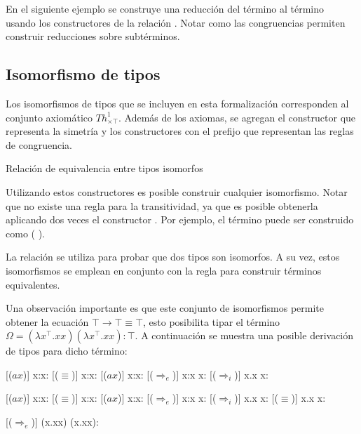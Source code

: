 \begin{example}
	En el siguiente ejemplo se construye una reducción del término  al término ~ usando los constructores de la relación \type{$\_\hookrightarrow\_$}.
	Notar como las congruencias permiten construir reducciones sobre subtérminos.
\end{example}

\subsection{Isomorfismo de tipos}

Los isomorfismos de tipos que se incluyen en esta formalización corresponden al conjunto axiomático $Th^1_{\times\top}$.
Además de los axiomas, se agregan el constructor  que representa la simetría y los constructores con el prefijo  que representan las reglas de congruencia.

\begin{codigo}
	Relación de equivalencia entre tipos isomorfos
	
\end{codigo}
Utilizando estos constructores es posible construir cualquier isomorfismo.
Notar que no existe una regla para la transitividad, ya que es posible obtenerla aplicando dos veces el constructor \const{$[\_]\equiv\_$}.
Por ejemplo, el término \const{[ trans}   \const{]$\equiv$}  puede ser construido como \const{[}  \const{]$\equiv$} (\const{[}  \const{]$\equiv$} ).

\begin{example}
	La relación \type{$\_\equiv\_$} se utiliza para probar que dos tipos son isomorfos.
	A su vez, estos isomorfismos se emplean en conjunto con la regla \const{$[\_]\equiv\_$} para construir términos equivalentes.
\end{example}

Una observación importante es que este conjunto de isomorfismos permite obtener la ecuación $\top \rightarrow \top \equiv \top$, esto posibilita tipar el término $\Omega = (\lambda x^\top.xx)(\lambda x^\top.xx): \top$.
A continuación se muestra una posible derivación de tipos para dicho término:

\begin{prooftree*}
	[($ax$)]{ x:\top \vdash x:\top }
	[($\equiv$)]{ x:\top \vdash x: \top \rightarrow \top }
	[($ax$)]{ x:\top \vdash x:\top }
	[($\Rightarrow_e$)]{ x:\top\vdash x x: \top }
	[($\Rightarrow_i$)]{ \vdash \lambda x.x x: \top \rightarrow \top }
	
	[($ax$)]{ x:\top \vdash x:\top }
	[($\equiv$)]{ x:\top\vdash x: \top \rightarrow \top }
	[($ax$)]{ x:\top \vdash x:\top }
	[($\Rightarrow_e$)]{ x:\top\vdash x x: \top }
	[($\Rightarrow_i$)]{ \vdash \lambda x.x x: \top \rightarrow \top }
	[($\equiv$)]{ \vdash \lambda x.x x: \top }
	
	[($\Rightarrow_e$)]{ \vdash (\lambda x.xx) (\lambda x.xx): \top }	
\end{prooftree*}

